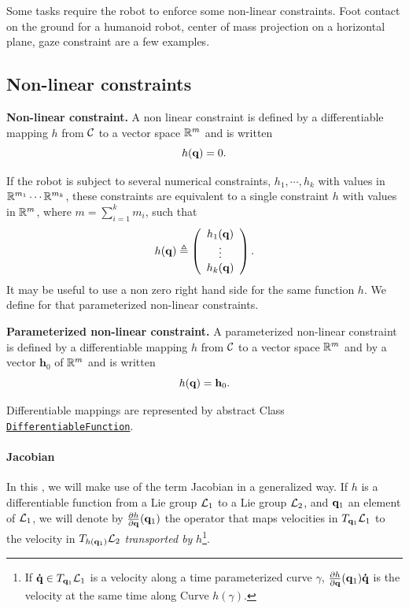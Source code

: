 Some tasks require the robot to enforce some non-linear constraints. Foot contact on the ground for a humanoid robot, center of mass projection on a horizontal plane, gaze constraint are a few examples.

\subsection{Non-linear constraints}

\begin{definition}\textbf{Non-linear constraint.} A non linear constraint is defined by a differentiable mapping $h$ from $\mathcal{C}$ to a vector space $\mathbb{R}^m$ and is written
\begin{equation}\label{eq:constraint}
h(\conf) = 0.
\end{equation}
\end{definition}
If the robot is subject to several numerical constraints, $h_1,\cdots,h_k$ with values in $\mathbb{R}^{m_1}\cdots\mathbb{R}^{m_k}$, these constraints are equivalent to a single constraint $h$ with values in $\mathbb{R}^{m}$, where $m=\sum_{i=1}^k m_i$, such that
$$
h(\mathbf{q}) \triangleq \left(\begin{array}{c} h_1(\mathbf{q}) \\ \vdots \\ h_k(\mathbf{q})
\end{array}\right).
$$
It may be useful to use a non zero right hand side for the same function $h$. We define for that parameterized non-linear constraints.
\begin{definition}\textbf{Parameterized non-linear constraint.}
  A parameterized non-linear constraint is defined by a differentiable mapping $h$ from $\mathcal{C}$ to a vector space $\mathbb{R}^m$ and by a vector $\mathbf{h}_0$ of $\mathbb{R}^m$ and is written
  $$
  h(\mathbf{q}) = \mathbf{h}_0.
  $$
\end{definition}
Differentiable mappings are represented by abstract Class\\ \href{https://gepettoweb.laas.fr/hpp/hpp-constraints/doxygen-html/classhpp_1_1constraints_1_1DifferentiableFunction.html}{\texttt{DifferentiableFunction}}.

\paragraph{Jacobian}

In this \paper, we will make use of the term Jacobian in a generalized way.
If $h$ is a differentiable function from a Lie group $\mathcal{L}_1$ to a Lie group $\mathcal{L}_2$, and $\mathbf{q}_1$ an element of $\mathcal{L}_1$, we will denote by $\frac{\partial h}{\partial\mathbf{q}}(\mathbf{q}_1)$ the operator that maps velocities in $T_{\mathbf{q}_1}\mathcal{L}_1$ to the velocity in $T_{h(\mathbf{q}_1)}\mathcal{L}_2$ \textit{transported by} $h$\footnote{If $\mathbf{\dot{q}}\in T_{\mathbf{q}_1}\mathcal{L}_1$ is a velocity along a time parameterized curve $\gamma$, $\frac{\partial h}{\partial\mathbf{q}}(\mathbf{q}_1)\mathbf{\dot{q}}$ is the velocity at
  the same time along Curve $h(\gamma)$.}.

